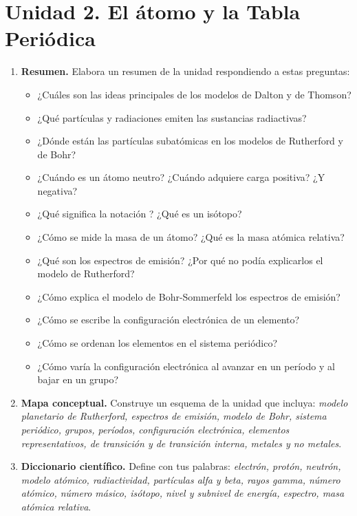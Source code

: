 \section{Unidad 2. El átomo y la Tabla Periódica}

\begin{enumerate}[label=\numberballblue]
    \item \textbf{Resumen.} Elabora un resumen de la unidad respondiendo a estas preguntas:
    \begin{itemize}
        \item ¿Cuáles son las ideas principales de los modelos de Dalton y de Thomson?
        \item ¿Qué partículas y radiaciones emiten las sustancias radiactivas?
        \item ¿Dónde están las partículas subatómicas en los modelos de Rutherford y de Bohr?
        \item ¿Cuándo es un átomo neutro? ¿Cuándo adquiere carga positiva? ¿Y negativa?
        \item ¿Qué significa la notación ? ¿Qué es un isótopo?
        \item ¿Cómo se mide la masa de un átomo? ¿Qué es la masa atómica relativa?
        \item ¿Qué son los espectros de emisión? ¿Por qué no podía explicarlos el modelo de Rutherford?
        \item ¿Cómo explica el modelo de Bohr-Sommerfeld los espectros de emisión?
        \item ¿Cómo se escribe la configuración electrónica de un elemento?
        \item ¿Cómo se ordenan los elementos en el sistema periódico?
        \item ¿Cómo varía la configuración electrónica al avanzar en un período y al bajar en un grupo?
    \end{itemize}
    \item \textbf{Mapa conceptual.} Construye un esquema de la unidad que incluya: \emph{modelo planetario de Rutherford, espectros de emisión, modelo de Bohr, sistema periódico, grupos, períodos, configuración electrónica, elementos representativos, de transición y de transición interna, metales y no metales}.
    \item \textbf{Diccionario científico.} Define con tus palabras: \emph{electrón, protón, neutrón, modelo atómico, radiactividad, partículas alfa y beta, rayos gamma, número atómico, número másico, isótopo, nivel y subnivel de energía, espectro, masa atómica relativa}.
\end{enumerate}

